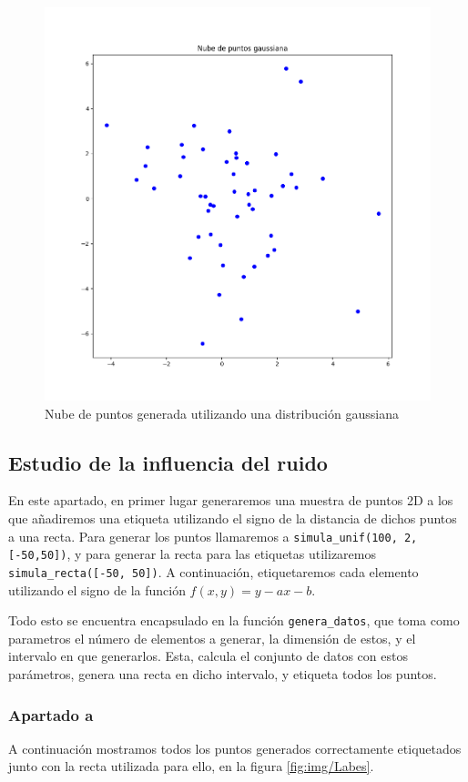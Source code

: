 \documentclass[
  a4paper,
  spanish,
  12pt,
  enlargefirstpage,
]{scrartcl}
\begin{document}
\begin{figure}[h]
    \centering
    \includegraphics[width=0.6\linewidth]{img/NubeGauss.png}
    \caption{Nube de puntos generada utilizando una distribución gaussiana}%
    \label{fig:img/NubeGauss}
\end{figure}

\subsection{Estudio de la influencia del ruido}%
\label{sub:estudio_de_la_influencia_del_ruido}
En este apartado, en primer lugar generaremos una muestra de puntos 2D a los que añadiremos una etiqueta utilizando el signo de la distancia de dichos puntos a una recta. Para generar los puntos llamaremos a \texttt{simula\_unif(100, 2, [-50,50])}, y para generar la recta para las etiquetas utilizaremos \texttt{simula\_recta([-50, 50])}. A continuación, etiquetaremos cada elemento utilizando el signo de la función \(f(x,y) = y - ax -b\).

Todo esto se encuentra encapsulado en la función \texttt{genera\_datos}, que toma como parametros el número de elementos a generar, la dimensión de estos, y el intervalo en que generarlos. Esta, calcula el conjunto de datos con estos parámetros, genera una recta en dicho intervalo, y etiqueta todos los puntos.

\subsubsection*{Apartado a}%
\label{sub:apartado_a}

A continuación mostramos todos los puntos generados correctamente etiquetados junto con la recta utilizada para ello, en la figura \ref{fig:img/Labes}.
\end{document}
